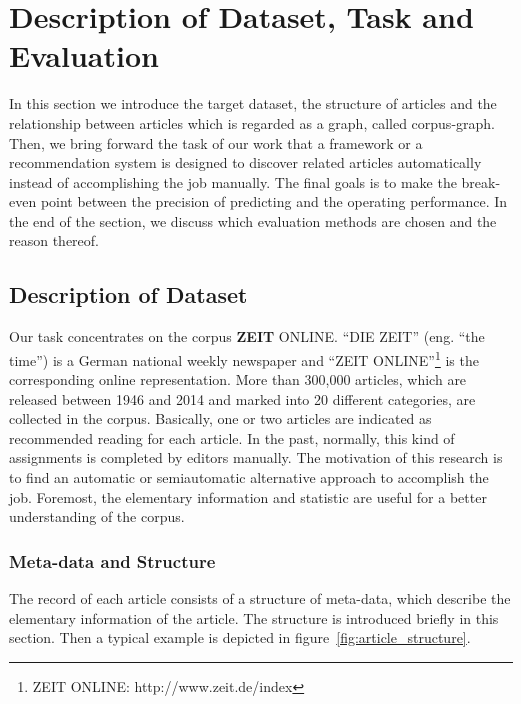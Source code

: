 \section{Description of Dataset, Task and Evaluation}
\label{sec:3}

In this section we introduce the target dataset, the structure of articles and the relationship between articles which is regarded as a graph, called corpus-graph. Then, we bring forward the task of our work that a framework or a recommendation system is designed to discover related articles automatically instead of accomplishing the job manually. The final goals is to make the break-even point between the precision of predicting and the operating performance. In the end of the section, we discuss which evaluation methods are chosen and the reason thereof. 

\subsection{Description of Dataset}
\label{sec:3.1}

Our task concentrates on the corpus \textbf{ZEIT} ONLINE. ``DIE ZEIT'' (eng. ``the time'') is a German national weekly newspaper and ``ZEIT ONLINE''\footnote{ZEIT ONLINE: http://www.zeit.de/index} is the corresponding online representation. More than 300,000 articles, which are released between 1946 and 2014 and marked into 20 different categories, are collected in the corpus. Basically, one or two articles are indicated as recommended reading for each article. In the past, normally, this kind of assignments is completed by editors manually. The motivation of this research is to find an automatic or semiautomatic alternative approach to accomplish the job. Foremost, the elementary information and statistic are useful for a better understanding of the corpus. 

\subsubsection{Meta-data and Structure}
\label{sec:3structure}

The record of each article consists of a structure of meta-data, which describe the elementary information of the article. The structure is introduced briefly in this section. Then a typical example is depicted in figure~\ref{fig:article_structure}.



